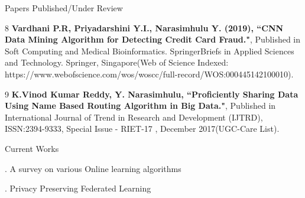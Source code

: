 \documentclass{resume} %
\begin{document}
\begin{rSection}{Papers Published/Under Review}
\begin{rSubsection}{}{}{}{}
		\item[8] \textbf{Vardhani P.R, Priyadarshini Y.I., Narasimhulu Y. (2019), ``CNN Data Mining Algorithm for Detecting Credit Card Fraud."}, Published in Soft Computing and Medical Bioinformatics. SpringerBriefs in Applied Sciences and Technology. Springer, Singapore(Web of Science Indexed: https://www.webofscience.com/wos/woscc/full-record/WOS:000445142100010).
		
		\item[9] \textbf{K.Vinod Kumar Reddy, Y. Narasimhulu, ``Proficiently Sharing Data Using Name Based Routing Algorithm in Big Data."}, Published in International Journal of Trend in Research and Development (IJTRD), ISSN:2394-9333, Special Issue - RIET-17 , December 2017(UGC-Care List).
	\end{rSubsection}
	
	
\end{rSection}

\begin{rSection}{Current Works}
	
	\begin{rSubsection}{}{}{}{}	
		\item[.] A survey on various Online learning algorithms
		\item[.] Privacy Preserving Federated Learning
	\end{rSubsection}
\end{rSection}
\end{document}
